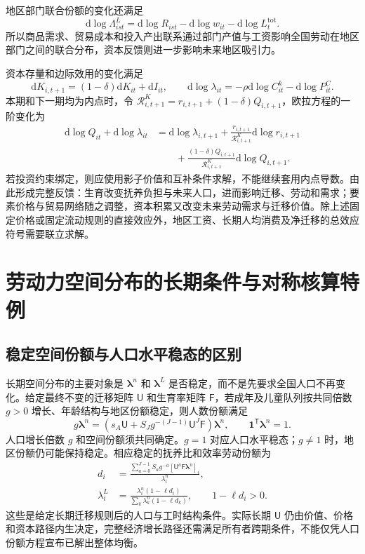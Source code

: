 \documentclass[UTF8,a4paper,zihao=-4,fontset=windows]{ctexart}
\numberwithin{equation}{section}
\newcommand{\pc}{P^{C}}
\newcommand{\invp}{Q}
\newcommand{\dd}{\mathrm{d}}
\newcommand{\ones}{\bm{1}}
\begin{document}
地区部门联合份额的变化还满足
\begin{equation}
 \dd\log\Lambda^L_{ist}=\dd\log R_{ist}-\dd\log w_{it}
 -\dd\log L_t^{\mathrm{tot}}.
 \label{eq:lg-joint-share-differential}
\end{equation}
所以商品需求、贸易成本和投入产出联系通过部门产值与工资影响全国劳动在地区部门之间的联合分布，资本反馈则进一步影响未来地区吸引力。

资本存量和边际效用的变化满足
\begin{equation}
 \dd K_{i,t+1}=(1-\delta)\dd K_{it}+\dd I_{it},\qquad
 \dd\log\lambda_{it}=-\rho\dd\log C^k_{it}-\dd\log\pc_{it}.
\end{equation}
本期和下一期均为内点时，令 $\mathcal R^K_{i,t+1}=r_{i,t+1}+(1-\delta)\invp_{i,t+1}$，欧拉方程的一阶变化为
\begin{align}
 \dd\log\invp_{it}+\dd\log\lambda_{it}
 &=\dd\log\lambda_{i,t+1}
 +\frac{r_{i,t+1}}{\mathcal R^K_{i,t+1}}\dd\log r_{i,t+1}\\
 &\qquad+\frac{(1-\delta)\invp_{i,t+1}}{\mathcal R^K_{i,t+1}}
 \dd\log\invp_{i,t+1}.
\end{align}
若投资约束绑定，则应使用影子价值和互补条件求解，不能继续套用内点导数。由此形成完整反馈：生育改变抚养负担与未来人口，进而影响迁移、劳动和需求；要素价格与贸易网络随之调整，资本积累又改变未来劳动需求与迁移价值。除上述固定价格或固定流动规则的直接效应外，地区工资、长期人均消费及净迁移的总效应符号需要联立求解。

\section{劳动力空间分布的长期条件与对称核算特例}
\label{sec:lg-steady-state}

\subsection{稳定空间份额与人口水平稳态的区别}
长期空间分布的主要对象是 $\bm\lambda^n$ 和 $\bm\lambda^L$ 是否稳定，而不是先要求全国人口不再变化。给定最终不变的迁移矩阵 $\mathsf U$ 和生育率矩阵 $\mathsf F$，若成年及儿童队列按共同倍数 $g>0$ 增长、年龄结构与地区份额稳定，则人数份额满足
\begin{equation}
 g\bm\lambda^n=\left(s_A\mathsf U
 +S_Jg^{-(J-1)}\mathsf U^J\mathsf F\right)\bm\lambda^n,\qquad
 \ones^{\mathsf T}\bm\lambda^n=1.
 \label{eq:lg-stationary-spatial-share}
\end{equation}
人口增长倍数 $g$ 和空间份额须共同确定。$g=1$ 对应人口水平稳态；$g\neq1$ 时，地区份额仍可能保持稳定。相应稳定的抚养比和效率劳动份额为
\begin{align}
 d_i&=\frac{\displaystyle\sum_{a=0}^{J-1}S_ag^{-a}
 [\mathsf U^a\mathsf F\bm\lambda^n]_i}{\lambda^n_i},\\
 \lambda^L_i&=\frac{\lambda^n_i(1-\ell d_i)}
 {\sum_k\lambda^n_k(1-\ell d_k)},\qquad 1-\ell d_i>0.
 \label{eq:lg-stationary-effective-share}
\end{align}
这些是给定长期迁移规则后的人口与工时结构条件。实际长期 $\mathsf U$ 仍由价值、价格和资本路径内生决定，完整经济增长路径还需满足所有者跨期条件，不能仅凭人口份额方程宣布已解出整体均衡。
\end{document}
